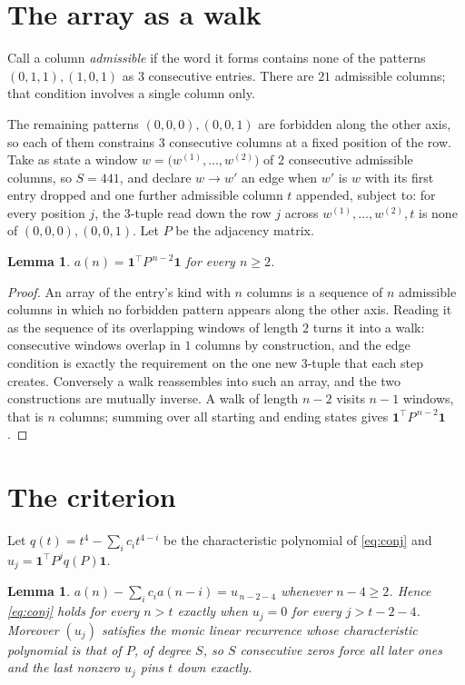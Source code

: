 \documentclass[11pt,a4paper]{article}
\theoremstyle{plain}
\newtheorem{lemma}[theorem]{Lemma}
\theoremstyle{definition}
\begin{document}
\section{The array as a walk}

Call a column \emph{admissible} if the word it forms contains none of the patterns
$(0,1,1), (1,0,1)$ as $3$ consecutive entries. There are $21$ admissible columns; that condition
involves a single column only.

The remaining patterns $(0,0,0), (0,0,1)$ are forbidden along the other axis, so each of them
constrains $3$ consecutive columns at a fixed position of the row. Take as state a
window $w=\bigl(w^{(1)},\dots,w^{(2)}\bigr)$ of $2$ consecutive admissible
columns, so $S=441$, and declare $w\to w'$ an edge when $w'$ is $w$ with its first entry
dropped and one further admissible column $t$ appended, subject to: for every position
$j$, the $3$-tuple read down the row $j$ across $w^{(1)},\dots,w^{(2)},t$
is none of $(0,0,0), (0,0,1)$. Let $P$ be the adjacency matrix.

\begin{lemma}\label{lem:walk}
$a(n)=\mathbf{1}^{\!\top}P^{\,n-2}\mathbf{1}$ for every $n\ge2$.
\end{lemma}

\begin{proof}
An array of the entry's kind with $n$ columns is a sequence of $n$ admissible columns in
which no forbidden pattern appears along the other axis. Reading it as the sequence of its
overlapping windows of length $2$ turns it into a walk: consecutive windows overlap in
$1$ columns by construction, and the edge condition is exactly the requirement on the one
new $3$-tuple that each step creates. Conversely a walk reassembles into such an array,
and the two constructions are mutually inverse. A walk of length $n-2$ visits $n-1$
windows, that is $n$ columns; summing over all starting and ending states gives
$\mathbf{1}^{\!\top}P^{\,n-2}\mathbf{1}$.
\end{proof}

\section{The criterion}

Let $q(t)=t^{4}-\sum_i c_i t^{4-i}$ be the characteristic polynomial of
\eqref{eq:conj} and $u_j=\mathbf{1}^{\!\top}P^{j}q(P)\mathbf{1}$.

\begin{lemma}\label{lem:crit}
$a(n)-\sum_i c_i a(n-i)=u_{\,n-2-4}$ whenever $n-4\ge2$. Hence
\eqref{eq:conj} holds for every $n>t$ exactly when $u_j=0$ for every
$j>t-2-4$. Moreover $(u_j)$ satisfies the monic linear recurrence whose
characteristic polynomial is that of $P$, of degree $S$, so $S$ consecutive zeros force all
later ones and the last nonzero $u_j$ pins $t$ down exactly.
\end{lemma}
\end{document}
